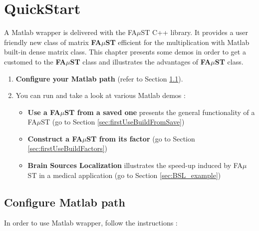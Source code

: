 \chapter{QuickStart}\label{sec:firstUse}

A Matlab wrapper is delivered with the FA$\mu$ST C++ library.
It provides a user friendly new class of matrix \textbf{FA$\mu$ST} efficient for the multiplication with Matlab built-in dense matrix class.\newline
This chapter presents some demos in order to get a customed to the \textbf{FA$\mu$ST} class and illustrates the advantages of \textbf{FA$\mu$ST} class.  
\begin{enumerate}  
	\item \textbf{Configure your Matlab path} (refer to Section \ref{sec:firstUseMatlabPath}).
	\item You can run and take a look at various Matlab demos :
	\begin{itemize}
		\item \textbf{Use a FA$\mu$ST from a saved one} presents the general functionality of a FA$\mu$ST (go to Section \ref{sec:firstUseBuildFromSave})
		\item \textbf{Construct a FA$\mu$ST from its factor}  (go to  Section \ref{sec:firstUseBuildFactors})
		\item \textbf{Brain Sources Localization}  illustrates the speed-up induced by FA$\mu$ST in a medical application (go to Section \ref{sec:BSL_example})	
	\end{itemize}
\end{enumerate} 





\section{Configure Matlab path}\label{sec:firstUseMatlabPath}
In order to use Matlab wrapper, follow the instructions :

